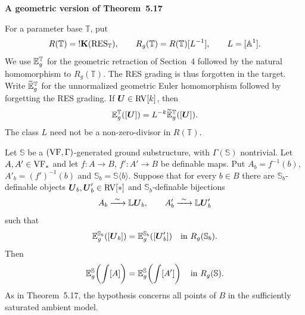 \begin{center}
 {\large\bfseries A geometric version of Theorem~5.17}
\end{center}

For a parameter base $\mathbb T$, put
\[
 R(\mathbb T)={!}\mathbf K(\mathrm{RES}_{\mathbb T}),\qquad
 R_g(\mathbb T)=R(\mathbb T)[L^{-1}],\qquad L=[\mathbb A^1].
\]
We use $\mathbb E_g^{\mathbb T}$ for the geometric retraction of Section~4
followed by the natural homomorphism to $R_g(\mathbb T)$.
The RES grading is thus forgotten in the target. Write $\widetilde{\mathbb E}_g^{\mathbb T}$
for the unnormalized geometric Euler homomorphism followed by forgetting
the RES grading. If $\boldsymbol{U}\in\mathrm{RV}[k]$, then
\begin{equation}\label{normalization}
 \mathbb E_g^{\mathbb T}([\boldsymbol{U}])=L^{-k}\widetilde{\mathbb E}_g^{\mathbb T}([\boldsymbol{U}]).
\end{equation}
The class $L$ need not be a non-zero-divisor in $R(\mathbb T)$.

\begin{proposition}
Let $\mathbb S$ be a $(\mathrm{VF},\Gamma)$-generated ground substructure,
with $\Gamma(\mathbb S)$ nontrivial. Let $A,A'\in\mathrm{VF}_*$ and let
$f:A\to B$, $f':A'\to B$ be definable maps. Put
$A_b=f^{-1}(b)$, $A'_b=(f')^{-1}(b)$ and
$\mathbb S_b=\mathbb S\langle b\rangle$.
Suppose that for every $b\in B$ there are
$\mathbb S_b$-definable objects $\boldsymbol{U}_b,\boldsymbol{U}'_b\in\mathrm{RV}[*]$ and
$\mathbb S_b$-definable bijections
\[
 A_b\xrightarrow{\ \sim\ }\mathbb L\boldsymbol{U}_b,
 \qquad A'_b\xrightarrow{\ \sim\ }\mathbb L\boldsymbol{U}'_b
\]
such that
\[
 \mathbb E_g^{\mathbb S_b}([\boldsymbol{U}_b])
 =\mathbb E_g^{\mathbb S_b}([\boldsymbol{U}'_b])
 \quad\text{in }R_g(\mathbb S_b).
\]
Then
\[
 \mathbb E_g^{\mathbb S}\!\left(\int[A]\right)
 =\mathbb E_g^{\mathbb S}\!\left(\int[A']\right)
 \quad\text{in }R_g(\mathbb S).
\]
As in Theorem~5.17, the hypothesis concerns all points of $B$ in the
sufficiently saturated ambient model.
\end{proposition}

